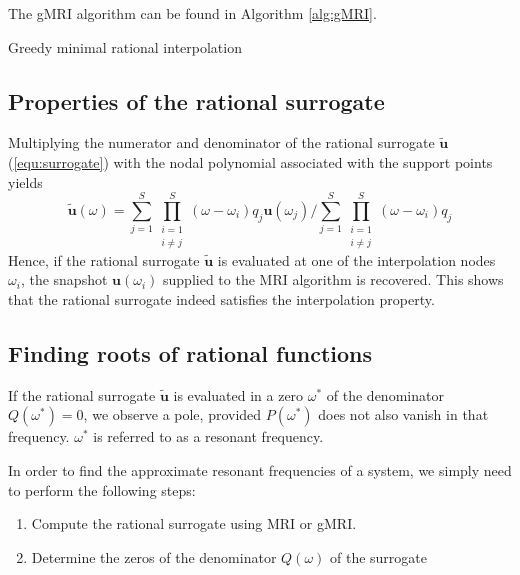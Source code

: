 \documentclass[11pt, a4paper]{article}
\begin{document}
The \acrshort{gMRI} algorithm can be found in Algorithm \ref{alg:gMRI}.

\begin{algorithm}
    \caption{Greedy minimal rational interpolation} \label{alg:gMRI}
    
\end{algorithm}

\subsection{Properties of the rational surrogate}
\label{subsec:properties}

Multiplying the numerator and denominator of the rational surrogate $\mathbf{\tilde{u}}$
(\ref{equ:surrogate}) with the nodal polynomial associated with the support points
yields
\begin{equation}
    \mathbf{\tilde{u}}(\omega)
    = \sum_{j=1}^S \prod_{\substack{i=1 \\ i \neq j}}^S (\omega - \omega_i) q_j \mathbf{u}(\omega_j)
    / \sum_{j=1}^S \prod_{\substack{i=1 \\ i \neq j}}^S (\omega - \omega_i) q_j
\end{equation}
Hence, if the rational surrogate $\mathbf{\tilde{u}}$ is evaluated at one of the
interpolation nodes $\omega_i$, the snapshot $\mathbf{u}(\omega_i)$ supplied to 
the \acrshort{MRI} algorithm is recovered. This shows that the rational surrogate
indeed satisfies the interpolation property.

\subsection{Finding roots of rational functions}
\label{subsec:roots}

If the rational surrogate $\mathbf{\tilde{u}}$ is evaluated in a zero
$\omega^\ast$ of the denominator $Q(\omega^\ast) = 0$, we observe a pole,
provided $P(\omega^\ast)$ does not also vanish in that frequency.
$\omega^\ast$ is referred to as a resonant frequency.

In order to find the approximate resonant frequencies of a system,
we simply need to perform the following steps:

\begin{enumerate}
    \item Compute the rational surrogate using \acrshort{MRI} or \acrshort{gMRI}.
    \item Determine the zeros of the denominator $Q(\omega)$ of the surrogate
\end{enumerate}
\end{document}

